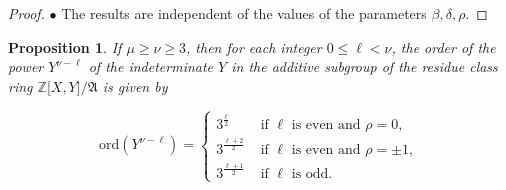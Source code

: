 \documentclass{amsart}
\newtheorem{proposition}{Proposition}[section]
\theoremstyle{definition}
\numberwithin{equation}{section}
\begin{document}
\begin{proof}
\(\bullet\)
The results are independent of the values of the parameters \(\beta,\delta,\rho\).
\end{proof}


\begin{proposition}
\label{prp:OrdPowY}
If \(\mu\ge\nu\ge 3\), then
for each integer \(0\le\ell<\nu\),
the order of the power \(Y^{\nu-\ell}\) of the indeterminate \(Y\)
in the additive subgroup of the residue class ring \(\mathbb{Z}\lbrack X,Y\rbrack/\mathfrak{A}\)
is given by

\begin{equation}
\label{eqn:OrdPowY}
\mathrm{ord}(Y^{\nu-\ell})=
\begin{cases}
3^{\frac{\ell}{2}} & \text{ if } \ell \text{ is even and } \rho=0,\\
3^{\frac{\ell+2}{2}} & \text{ if } \ell \text{ is even and } \rho=\pm 1,\\
3^{\frac{\ell+1}{2}} & \text{ if } \ell \text{ is odd}.
\end{cases}
\end{equation}

\end{proposition}
\end{document}
